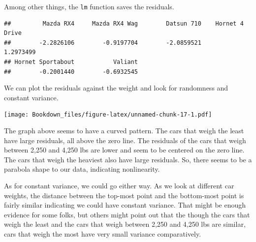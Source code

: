 \documentclass[
]{book}
\newenvironment{Shaded}{\begin{snugshade}}{\end{snugshade}}
\newcommand{\DataTypeTok}[1]{\textcolor[rgb]{0.13,0.29,0.53}{#1}}
\newcommand{\DecValTok}[1]{\textcolor[rgb]{0.00,0.00,0.81}{#1}}
\newcommand{\KeywordTok}[1]{\textcolor[rgb]{0.13,0.29,0.53}{\textbf{#1}}}
\newcommand{\NormalTok}[1]{#1}
\newcommand{\OperatorTok}[1]{\textcolor[rgb]{0.81,0.36,0.00}{\textbf{#1}}}
\newcommand{\StringTok}[1]{\textcolor[rgb]{0.31,0.60,0.02}{#1}}
\begin{document}
Among other things, the \texttt{lm} function saves the residuals.

\begin{Shaded}
\end{Shaded}

\begin{verbatim}
##         Mazda RX4     Mazda RX4 Wag        Datsun 710    Hornet 4 Drive 
##        -2.2826106        -0.9197704        -2.0859521         1.2973499 
## Hornet Sportabout           Valiant 
##        -0.2001440        -0.6932545
\end{verbatim}

We can plot the residuals against the weight and look for randomness and constant variance.

\begin{Shaded}
\end{Shaded}

\texttt{[image: Bookdown\_files/figure-latex/unnamed-chunk-17-1.pdf]}

The graph above seems to have a curved pattern. The cars that weigh the least have large residuals, all above the zero line. The residuals of the cars that weigh between 2,250 and 4,250 lbs are lower and seem to be centered on the zero line. The cars that weigh the heaviest also have large residuals. So, there seems to be a parabola shape to our data, indicating nonlinearity.

As for constant variance, we could go either way. As we look at different car weights, the distance between the top-most point and the bottom-most point is fairly similar indicating we could have constant variance. That might be enough evidence for some folks, but others might point out that the though the cars that weigh the least and the cars that weigh between 2,250 and 4,250 lbs are similar, cars that weigh the most have very small variance comparatively.
\end{document}

